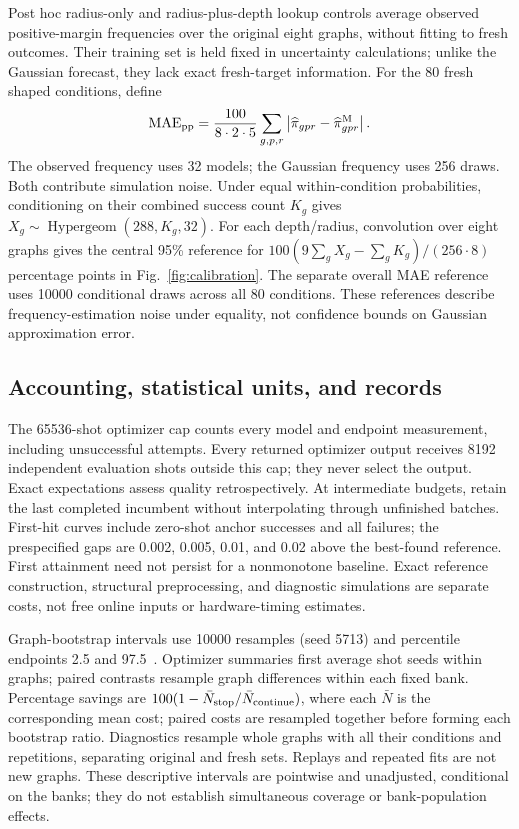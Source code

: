 \documentclass[11pt]{article}
\begin{document}
Post hoc radius-only and radius-plus-depth lookup controls average observed
positive-margin frequencies over the original eight graphs, without fitting
to fresh outcomes. Their training set is held fixed in uncertainty
calculations; unlike the Gaussian forecast, they lack exact fresh-target
information. For the 80 fresh shaped conditions, define
\begin{equation}
 \operatorname{MAE}_{\rm pp}=\frac{100}{8\cdot2\cdot5}
 \sum_{g,p,r}\left|\widehat\pi_{gpr}-\widehat\pi^{\rm M}_{gpr}\right|.
 \label{eq:probabilitymae}
\end{equation}
The observed frequency uses 32 models; the Gaussian frequency uses 256
draws. Both contribute simulation noise. Under equal within-condition
probabilities, conditioning on their combined success count $K_g$ gives
$X_g\sim\operatorname{Hypergeom}(288,K_g,32)$. For each depth/radius,
convolution over eight graphs gives the central 95\% reference for
$100(9\sum_gX_g-\sum_gK_g)/(256\cdot8)$ percentage points in
Fig.~\ref{fig:calibration}. The separate overall MAE reference uses 10000
conditional draws across all 80 conditions. These references describe
frequency-estimation noise under equality, not confidence bounds on
Gaussian approximation error.

\subsection{Accounting, statistical units, and records}
The 65536-shot optimizer cap counts every model and endpoint measurement,
including unsuccessful attempts. Every returned optimizer output receives
8192 independent evaluation shots outside this cap; they never select the
output. Exact expectations assess quality retrospectively. At intermediate
budgets, retain the last completed incumbent without interpolating through
unfinished batches. First-hit curves include zero-shot anchor successes
and all failures; the prespecified gaps are 0.002, 0.005, 0.01, and 0.02
above the best-found reference. First attainment need not persist for a
nonmonotone baseline. Exact reference construction, structural preprocessing,
and diagnostic simulations are separate costs, not free online inputs or
hardware-timing estimates.

Graph-bootstrap intervals use 10000 resamples (seed 5713) and percentile
endpoints 2.5 and 97.5~\cite{efron1993}. Optimizer summaries first average
shot seeds within graphs; paired contrasts resample graph differences
within each fixed bank. Percentage savings are
$100(1-\bar N_{\rm stop}/\bar N_{\rm continue})$, where each $\bar N$
is the corresponding mean cost; paired costs are resampled together
before forming each bootstrap ratio.
Diagnostics resample whole graphs with all their
conditions and repetitions, separating original and fresh sets. Replays
and repeated fits are not new graphs. These descriptive intervals are
pointwise and unadjusted, conditional on the banks; they do not establish
simultaneous coverage or bank-population effects.
\end{document}

